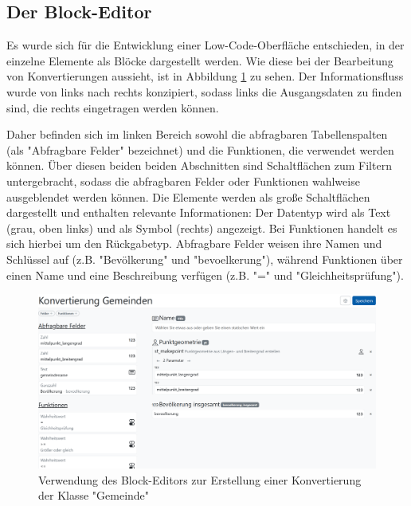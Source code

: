 \subsection{Der Block-Editor}

Es wurde sich für die Entwicklung einer Low-Code-Oberfläche entschieden, in der einzelne Elemente als Blöcke dargestellt werden. Wie diese bei der Bearbeitung von Konvertierungen aussieht, ist in Abbildung \ref{fig:buffet-simple} zu sehen. Der Informationsfluss wurde von links nach rechts konzipiert, sodass links die Ausgangsdaten zu finden sind, die rechts eingetragen werden können.

Daher befinden sich im linken Bereich sowohl die abfragbaren Tabellenspalten (als "Abfragbare Felder" bezeichnet) und die Funktionen, die verwendet werden können. Über diesen beiden beiden Abschnitten sind Schaltflächen zum Filtern untergebracht, sodass die abfragbaren Felder oder Funktionen wahlweise ausgeblendet werden können. Die Elemente werden als große Schaltflächen dargestellt und enthalten relevante Informationen: Der Datentyp wird als Text (grau, oben links) und als Symbol (rechts) angezeigt. Bei Funktionen handelt es sich hierbei um den Rückgabetyp.  Abfragbare Felder weisen ihre Namen und Schlüssel auf (z.B. "Bevölkerung" und "bevoelkerung"), während Funktionen über einen Name und eine Beschreibung verfügen (z.B. "=" und "Gleichheitsprüfung"). 

\begin{figure}[ht]
  \centering
  \includegraphics[width=.95\textwidth]{assets/buffet-simple.png}
  \caption{Verwendung des Block-Editors zur Erstellung einer Konvertierung der Klasse "Gemeinde"}
  \label{fig:buffet-simple}
\end{figure}

